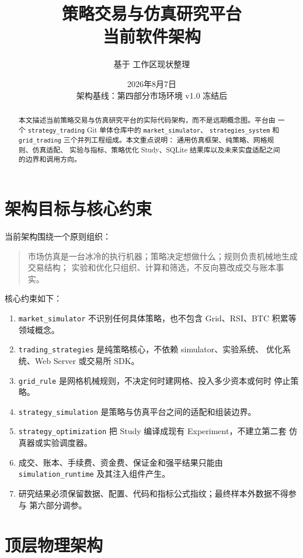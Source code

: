 \documentclass[UTF8,fontset=fandol,11pt,a4paper]{ctexart}
\title{\bfseries 策略交易与仿真研究平台\\当前软件架构}
\author{基于 \code{strategy_trading} 工作区现状整理}
\date{2026年8月7日\\架构基线：第四部分市场环境 v1.0 冻结后}
\newcommand{\code}[1]{\nolinkurl{#1}}
\begin{document}
\maketitle
\thispagestyle{empty}

\begin{abstract}
本文描述当前策略交易与仿真研究平台的实际代码架构，而不是远期概念图。平台由
一个 \code{strategy_trading} Git 单体仓库中的 \code{market_simulator}、
\code{strategies_system} 和 \code{grid_trading} 三个并列工程组成。本文重点说明：
通用仿真框架、纯策略、网格规则、仿真适配、
实验与指标、策略优化 Study、SQLite 结果库以及未来实盘适配之间的边界和调用方向。
\end{abstract}

\tableofcontents
\clearpage

\section{架构目标与核心约束}

当前架构围绕一个原则组织：

\begin{quote}
市场仿真是一台冰冷的执行机器；策略决定想做什么；规则负责机械地生成交易结构；
实验和优化只组织、计算和筛选，不反向篡改成交与账本事实。
\end{quote}

核心约束如下：

\begin{enumerate}
  \item \code{market_simulator} 不识别任何具体策略，也不包含 Grid、RSI、BTC
        积累等领域概念。
  \item \code{trading_strategies} 是纯策略核心，不依赖 simulator、实验系统、
        优化系统、Web Server 或交易所 SDK。
  \item \code{grid_rule} 是网格机械规则，不决定何时建网格、投入多少资本或何时
        停止策略。
  \item \code{strategy_simulation} 是策略与仿真平台之间的适配和组装边界。
  \item \code{strategy_optimization} 把 Study 编译成现有 Experiment，不建立第二套
        仿真器或实验调度器。
  \item 成交、账本、手续费、资金费、保证金和强平结果只能由
        \code{simulation_runtime} 及其注入组件产生。
  \item 研究结果必须保留数据、配置、代码和指标公式指纹；最终样本外数据不得参与
        第六部分调参。
\end{enumerate}

\section{顶层物理架构}
\end{document}
